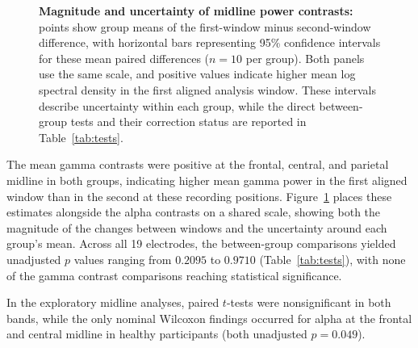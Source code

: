 \documentclass[11pt,letterpaper]{article}
\begin{document}
\begin{figure}[H]
\caption{\textbf{Magnitude and uncertainty of midline power contrasts:} points show group means of the first-window minus second-window difference, with horizontal bars representing 95\% confidence intervals for these mean paired differences (\(n=10\) per group). Both panels use the same scale, and positive values indicate higher mean log spectral density in the first aligned analysis window. These intervals describe uncertainty within each group, while the direct between-group tests and their correction status are reported in Table~\ref{tab:tests}.}
\label{fig:contrasts}
\end{figure}

The mean gamma contrasts were positive at the frontal, central, and parietal midline in both groups, indicating higher mean gamma power in the first aligned window than in the second at these recording positions. Figure~\ref{fig:contrasts} places these estimates alongside the alpha contrasts on a shared scale, showing both the magnitude of the changes between windows and the uncertainty around each group's mean. Across all 19 electrodes, the between-group comparisons yielded unadjusted \(p\) values ranging from \(0.2095\) to \(0.9710\) (Table~\ref{tab:tests}), with none of the gamma contrast comparisons reaching statistical significance.

In the exploratory midline analyses, paired \(t\)-tests were nonsignificant in both bands, while the only nominal Wilcoxon findings occurred for alpha at the frontal and central midline in healthy participants (both unadjusted \(p=0.049\)).
\end{document}
